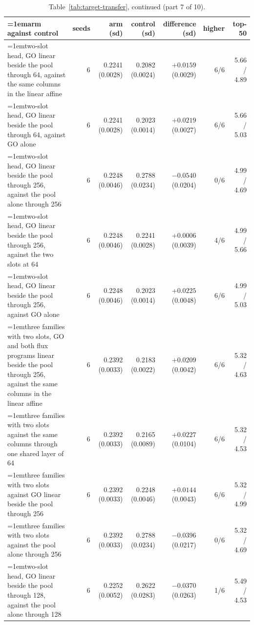 \begin{table}[H]
  \centering
  \footnotesize
  \setlength{\tabcolsep}{2.5pt}
  \caption[The rounds on betaxanthin: arm against control, continued]{Table~\ref{tab:target-transfer}, continued (part 7 of 10).}
  \label{tab:target-transfer-7}
  \begin{tabular}{@{}>{\raggedright\hangindent=1em\hangafter=1\arraybackslash}p{78.5mm}rrrrrr@{}}
    \hline
    arm against control & seeds & arm (sd) & control (sd) & difference (sd) & higher & top-50 \\
    \hline
    two-slot head, GO linear beside the pool through 64, against the same columns in the linear affine & 6 & 0.2241 (0.0028) & 0.2082 (0.0024) & $+0.0159$ (0.0029) & 6/6 & 5.66 / 4.89 \\
    two-slot head, GO linear beside the pool through 64, against GO alone & 6 & 0.2241 (0.0028) & 0.2023 (0.0014) & $+0.0219$ (0.0027) & 6/6 & 5.66 / 5.03 \\
    two-slot head, GO linear beside the pool through 256, against the pool alone through 256 & 6 & 0.2248 (0.0046) & 0.2788 (0.0234) & $-0.0540$ (0.0204) & 0/6 & 4.99 / 4.69 \\
    two-slot head, GO linear beside the pool through 256, against the two slots at 64 & 6 & 0.2248 (0.0046) & 0.2241 (0.0028) & $+0.0006$ (0.0039) & 4/6 & 4.99 / 5.66 \\
    two-slot head, GO linear beside the pool through 256, against GO alone & 6 & 0.2248 (0.0046) & 0.2023 (0.0014) & $+0.0225$ (0.0048) & 6/6 & 4.99 / 5.03 \\
    three families with two slots, GO and both flux programs linear beside the pool through 256, against the same columns in the linear affine & 6 & 0.2392 (0.0033) & 0.2183 (0.0022) & $+0.0209$ (0.0042) & 6/6 & 5.32 / 4.63 \\
    three families with two slots against the same columns through one shared layer of 64 & 6 & 0.2392 (0.0033) & 0.2165 (0.0089) & $+0.0227$ (0.0104) & 6/6 & 5.32 / 4.53 \\
    three families with two slots against GO linear beside the pool through 256 & 6 & 0.2392 (0.0033) & 0.2248 (0.0046) & $+0.0144$ (0.0043) & 6/6 & 5.32 / 4.99 \\
    three families with two slots against the pool alone through 256 & 6 & 0.2392 (0.0033) & 0.2788 (0.0234) & $-0.0396$ (0.0217) & 0/6 & 5.32 / 4.69 \\
    two-slot head, GO linear beside the pool through 128, against the pool alone through 128 & 6 & 0.2252 (0.0052) & 0.2622 (0.0283) & $-0.0370$ (0.0263) & 1/6 & 5.49 / 4.53 \\

\end{tabular}
\end{table}
